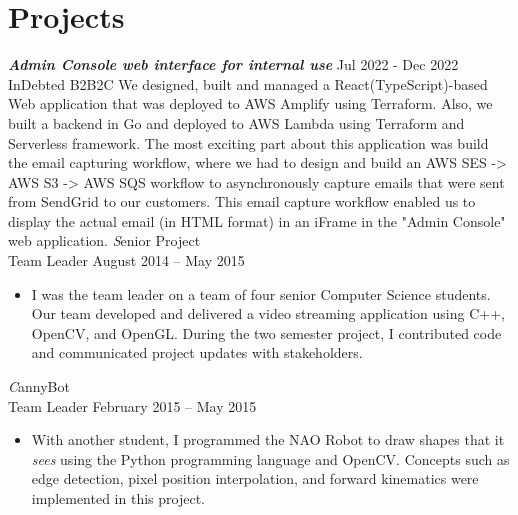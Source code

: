 \section{Projects}
  {\textsl \textbf{Admin Console web interface for internal use}} \hfill Jul 2022 - Dec 2022 \\ InDebted \hfill B2B2C
  We designed, built and managed a React(TypeScript)-based Web application that was deployed to AWS Amplify using Terraform. Also, we built a backend in Go and deployed to AWS Lambda using Terraform and Serverless framework. The most exciting part about this application was build the email capturing workflow, where we had to design and build an AWS SES -> AWS S3 -> AWS SQS workflow to asynchronously capture emails that were sent from SendGrid to our customers. This email capture workflow enabled us to display the actual email (in HTML format) in an iFrame in the "Admin Console" web application.
  {\textsl Senior Project} \\ Team Leader \hfill August 2014 -- May 2015
  \begin{itemize}
    \item I was the team leader on a team of four senior Computer Science students. Our team developed and delivered a video streaming application using C++, OpenCV, and OpenGL. During the two semester project, I contributed code and communicated project updates with stakeholders.
  \end{itemize}
  {\textsl CannyBot} \\ Team Leader \hfill February 2015 -- May 2015
  \begin{itemize}
    \item With another student, I programmed the NAO Robot to draw shapes that it \textit{sees} using the Python programming language and OpenCV. Concepts such as edge detection, pixel position interpolation, and forward kinematics were implemented in this project.
  \end{itemize}
